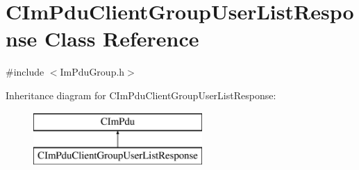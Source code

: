 \hypertarget{class_c_im_pdu_client_group_user_list_response}{}\section{C\+Im\+Pdu\+Client\+Group\+User\+List\+Response Class Reference}
\label{class_c_im_pdu_client_group_user_list_response}


{\ttfamily \#include $<$Im\+Pdu\+Group.\+h$>$}

Inheritance diagram for C\+Im\+Pdu\+Client\+Group\+User\+List\+Response\+:\begin{figure}[H]
\begin{center}
\leavevmode
\includegraphics[height=2.000000cm]{class_c_im_pdu_client_group_user_list_response}
\end{center}
\end{figure}
